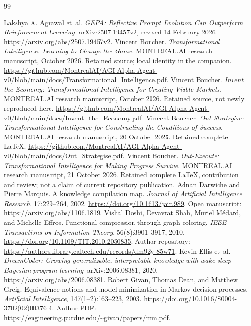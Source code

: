 \documentclass[11pt,letterpaper]{article}
\theoremstyle{remark}\newtheorem{remark}{Remark}[section]
\begin{document}
\clearpage
\begin{thebibliography}{99}
\footnotesize\raggedright\setlength{\itemsep}{.10em}\setlength{\parsep}{0pt}
Lakshya A. Agrawal et~al. \emph{GEPA: Reflective Prompt Evolution Can Outperform Reinforcement Learning}. arXiv:2507.19457v2, revised 14 February 2026. \url{https://arxiv.org/abs/2507.19457v2}.
Vincent Boucher. \emph{Transformational Intelligence: Learning to Change the Game}. MONTREAL.AI research manuscript, October 2026. Retained source; local identity in the companion. \url{https://github.com/MontrealAI/AGI-Alpha-Agent-v0/blob/main/docs/Transformational_Intelligence.pdf}.
Vincent Boucher. \emph{Invent the Economy: Transformational Intelligence for Creating Viable Markets}. MONTREAL.AI research manuscript, October 2026. Retained source, not newly reproduced here. \url{https://github.com/MontrealAI/AGI-Alpha-Agent-v0/blob/main/docs/Invent_the_Economy.pdf}.
Vincent Boucher. \emph{Out-Strategise: Transformational Intelligence for Constructing the Conditions of Success}. MONTREAL.AI research manuscript, 20 October 2026. Retained complete LaTeX. \url{https://github.com/MontrealAI/AGI-Alpha-Agent-v0/blob/main/docs/Out_Strategise.pdf}.
Vincent Boucher. \emph{Out-Execute: Transformational Intelligence for Making Progress Survive}. MONTREAL.AI research manuscript, 21 October 2026. Retained complete LaTeX, contribution and review; not a claim of current repository publication.
Adnan Darwiche and Pierre Marquis. A knowledge compilation map. \emph{Journal of Artificial Intelligence Research}, 17:229--264, 2002. \url{https://doi.org/10.1613/jair.989}. Open manuscript: \url{https://arxiv.org/abs/1106.1819}.
Vishal Doshi, Devavrat Shah, Muriel Médard, and Michelle Effros. Functional compression through graph coloring. \emph{IEEE Transactions on Information Theory}, 56(8):3901--3917, 2010. \url{https://doi.org/10.1109/TIT.2010.2050835}. Author repository: \url{https://authors.library.caltech.edu/records/dm92y-85w71}.
Kevin Ellis et~al. \emph{DreamCoder: Growing generalizable, interpretable knowledge with wake-sleep Bayesian program learning}. arXiv:2006.08381, 2020. \url{https://arxiv.org/abs/2006.08381}.
Robert Givan, Thomas Dean, and Matthew Greig. Equivalence notions and model minimization in Markov decision processes. \emph{Artificial Intelligence}, 147(1--2):163--223, 2003. \url{https://doi.org/10.1016/S0004-3702(02)00376-4}. Author PDF: \url{https://engineering.purdue.edu/~givan/papers/mm.pdf}.

\end{thebibliography}
\end{document}
